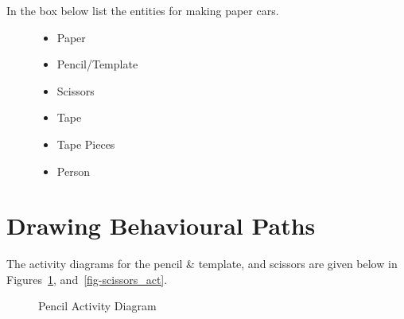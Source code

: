 \documentclass[
  10pt,
  a4paperpaper,
  DIV=11,
  numbers=noendperiod,
  oneside]{scrreprt}
\providecommand{\tightlist}{%
  \setlength{\itemsep}{0pt}\setlength{\parskip}{0pt}}\usepackage{longtable,booktabs,array}
\begin{document}
In the box below list the entities for making paper cars.

\begin{figure}

\begin{mdframed}[innerbottommargin=4.5cm]

\begin{itemize}
\tightlist
\item
  Paper
\item
  Pencil/Template
\item
  Scissors
\item
  Tape
\item
  Tape Pieces
\item
  Person
\end{itemize}

\end{mdframed}

\end{figure}%

\newpage{}

\section{Drawing Behavioural Paths}\label{drawing-behavioural-paths-1}

The activity diagrams for the pencil \& template, and scissors are given
below in Figures~\ref{fig-pencil_act}, and~\ref{fig-scissors_act}.

\begin{figure}[htbp]


\caption{\label{fig-pencil_act}Pencil Activity Diagram}

\end{figure}%
\end{document}
